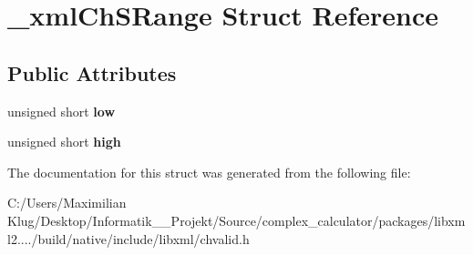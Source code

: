 \hypertarget{struct__xml_ch_s_range}{}\section{\+\_\+xml\+Ch\+S\+Range Struct Reference}
\label{struct__xml_ch_s_range}
\subsection*{Public Attributes}
\begin{DoxyCompactItemize}
\item 
\mbox{\label{struct__xml_ch_s_range_ae6678d601f260427bcad0fd8474df97d}} 
unsigned short {\bfseries low}
\item 
\mbox{\label{struct__xml_ch_s_range_a050bc6f71d4bfcf455db4789ec725f1d}} 
unsigned short {\bfseries high}
\end{DoxyCompactItemize}


The documentation for this struct was generated from the following file\+:\begin{DoxyCompactItemize}
\item 
C\+:/\+Users/\+Maximilian Klug/\+Desktop/\+Informatik\+\_\+\_\+\+Projekt/\+Source/complex\+\_\+calculator/packages/libxml2..../build/native/include/libxml/chvalid.\+h\end{DoxyCompactItemize}
